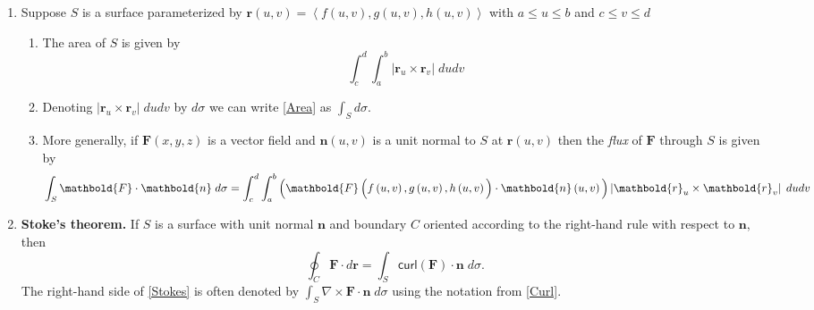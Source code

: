 \documentclass[12pt]{article}
\begin{document}
\begin{enumerate}
\item Suppose $S$ is a surface parameterized by
$\mathbold{r}\left(u,v\right)
=\left\langle f\left(u,v\right),g\left(u,v\right),h\left(u,v\right)
\right\rangle$ with $a\le u\le b$ and $c\le v\le d$
\begin{enumerate}
\item The area of $S$ is given by
\begin{equation}\label{Area}
\int_c^d\int_a^b\left|\mathbold{r}_u\times\mathbold{r}_v
\right|\;dudv
\end{equation}
\item Denoting $\left|\mathbold{r}_u\times\mathbold{r}_v\right|\;dudv$
by $d\sigma$ we can write \autoref{Area} as
$\int_Sd\sigma$.
\item More generally, if $\mathbold{F}\left(x,y,z\right)$
is a vector field and $\mathbold{n}\left(u,v\right)$
is a unit normal to $S$ at $\mathbold{r}\left(u,v\right)$
then the {\em flux} of $\mathbold{F}$ through $S$
is given by
\[\int_S\mathbold{F}\cdot\mathbold{n}\;d\sigma
=\int_c^d\int_a^b\left(
\mathbold{F}\left(f\left(u,v\right),g\left(u,v\right),
h\left(u,v\right)\rule{0pt}{11pt}\right)
\cdot\mathbold{n}\left(u,v\right)\rule{0pt}{12pt}\right)
\left|\mathbold{r}_u\times\mathbold{r}_v
\right|\;dudv\]
\end{enumerate}

\item{\bf Stoke's theorem.}
If $S$ is a surface with unit normal $\mathbold{n}$
and boundary $C$ oriented according to the right-hand rule
with respect to $\mathbold{n}$, then
\begin{equation}\label{Stokes}
\oint_C\mathbold{F}\cdot d\mathbold{r}
=\int_S\mathsf{curl}\left(\mathbold{F}\right)
\cdot\mathbold{n}\;d\sigma.
\end{equation}
The right-hand side of \autoref{Stokes} is often
denoted by $\int_S\nabla\times\mathbold{F}\cdot\mathbold{n}\;
d\sigma$ using the notation from \autoref{Curl}.
\end{enumerate}
\end{document}
